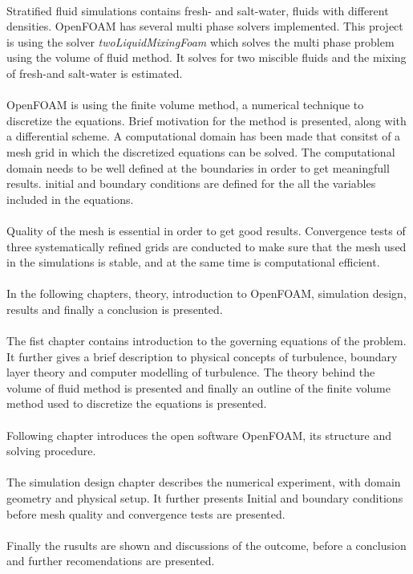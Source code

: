 \documentclass[a4paper, 12pt]{report}
\begin{document}
\\
Stratified fluid simulations contains fresh- and salt-water, fluids with different densities. OpenFOAM has several multi phase solvers implemented. This project is using the solver \textit{twoLiquidMixingFoam} which solves the multi phase problem using the volume of fluid method. It solves for two miscible fluids and the mixing of fresh-and salt-water is estimated.\\
\\
OpenFOAM is using the finite volume method, a numerical technique to discretize the equations. Brief motivation for the method is presented, along with a differential scheme. A computational domain has been made that consitst of a mesh grid in which the discretized equations can be solved. The computational domain needs to be well defined at the boundaries in order to get meaningfull results. initial and boundary conditions are defined for the all the variables included in the equations.\\
\\
Quality of the mesh is essential in order to get good results. Convergence tests of three systematically refined grids are conducted to make sure that the mesh used in the simulations is stable, and at the same time is computational efficient.\\
\\
In the following chapters, theory, introduction to OpenFOAM, simulation design, results and finally a conclusion is presented.\\
\\
The fist chapter contains introduction to the governing equations of the problem. It further gives a brief description to physical concepts of turbulence, boundary layer theory and computer modelling of turbulence. The theory behind the volume of fluid method is presented and finally an outline of the finite volume method used to discretize the equations is presented.\\
\\
Following chapter introduces the open software OpenFOAM, its structure and solving procedure.\\
\\
The simulation design chapter describes the numerical experiment, with domain geometry and physical setup. It further presents Initial and boundary conditions before mesh quality and convergence tests are presented.\\
\\
Finally the rusults are shown and discussions of the outcome, before a conclusion and further recomendations are presented.  
\end{document}
